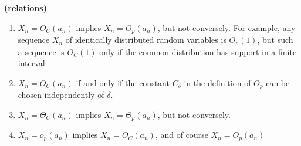 \documentclass{article}
\newcommand{\bfs}[1]{\textbf{({#1}) }}
\begin{document}
\begin{rema}{\bfs{relations}}
\begin{enumerate}
    \item $X_{n}=O_{C}\left(a_{n}\right)$ implies $X_{n}=O_{p}\left(a_{n}\right)$, but not conversely. For example, any sequence $X_{n}$ of identically distributed random variables is $O_{p}(1)$, but such a sequence is $O_{C}(1)$ only if the common distribution has support in a finite interval.
    \item $X_{n}=O_{C}\left(a_{n}\right)$ if and only if the constant $C_{\delta}$ in the definition of $O_{p}$ can be chosen independently of $\delta$.
    \item $X_{n}=\Theta_{C}\left(a_{n}\right)$ implies $X_{n}=\Theta_{p}\left(a_{n}\right)$, but not conversely.
    \item $X_{n}=o_{p}\left(a_{n}\right)$ implies $X_{n}=O_{C}\left(a_{n}\right)$, and of course $X_{n}=O_{p}\left(a_{n}\right)$ 
\end{enumerate}
\end{rema}
\end{document}
